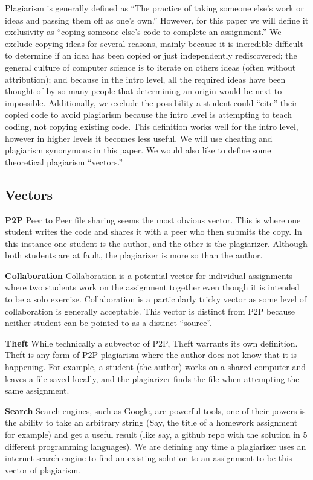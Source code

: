 \documentclass[10pt]{article}
\newcommand{\n}{\hfill\break}
\begin{document}
Plagiarism is generally defined as ``The practice of taking someone else's work or ideas and passing them off as one's own.''\cite{oxed}  However, for this paper we will define it exclusivity as ``coping someone else's code to complete an assignment.''  We exclude copying ideas for several reasons, mainly because it is incredible difficult to determine if an idea has been copied or just independently rediscovered; the general culture of computer science is to iterate on others ideas (often without attribution\cite{gibson-reuse}); and because in the intro level, all the required ideas have been thought of by so many people that determining an origin would be next to impossible.  Additionally, we exclude the possibility a student could ``cite'' their copied code to avoid plagiarism because the intro level is attempting to teach coding, not copying existing code.  This definition works well for the intro level, however in higher levels it becomes less useful.  We will use cheating and plagiarism synonymous in this paper.  We would also like to define some theoretical plagiarism ``vectors.''
\subsection{Vectors}

 \noindent\textbf{P2P} Peer to Peer file sharing seems the most obvious vector.  This is where one student writes the code and shares it with a peer who then submits the copy.  In this instance one student is the author, and the other is the plagiarizer.  Although both students are at fault, the plagiarizer is more so than the author.  
	
	 \n\noindent\textbf{Collaboration} Collaboration is a potential vector for individual assignments where two students work on the assignment together even though it is intended to be a solo exercise.  Collaboration is a particularly tricky vector as some level of collaboration is generally acceptable.  This vector is distinct from P2P because neither student can be pointed to as a distinct ``source''.
	
	 \n\noindent\textbf{Theft}  While technically a subvector of P2P, Theft warrants its own definition.  Theft is any form of P2P plagiarism where the author does not know that it is happening.  For example, a student (the author) works on a shared computer and leaves a file saved locally, and the plagiarizer finds the file when attempting the same assignment.  
	
	 \n\noindent\textbf{Search}  Search engines, such as Google, are powerful tools, one of their powers is the ability to take an arbitrary string (Say, the title of a homework assignment for example) and get a useful result (like say, a github repo with the solution in 5 different programming languages).  We are defining any time a plagiarizer uses an internet search engine to find an existing solution to an assignment to be this vector of plagiarism.
	
\end{document}

